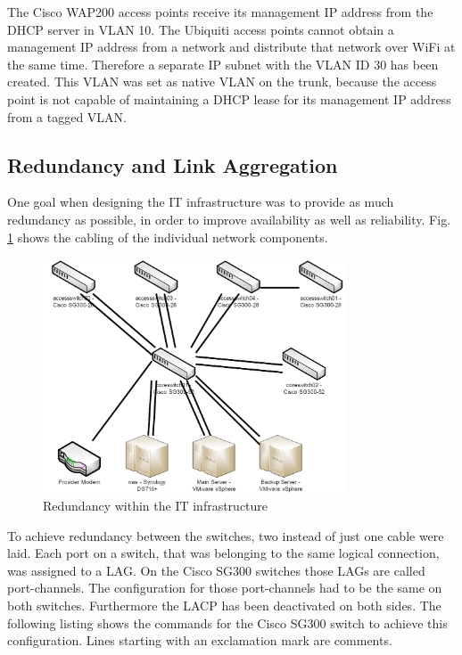 The Cisco WAP200 access points receive its management IP address from the DHCP server in VLAN 10. The Ubiquiti access points cannot obtain a management IP address from a network and distribute that network over WiFi at the same time. Therefore a separate IP subnet with the VLAN ID 30 has been created. This VLAN was set as native VLAN on the trunk, because the access point is not capable of maintaining a DHCP lease for its management IP address from a tagged VLAN. 

\subsection{Redundancy and Link Aggregation}

One goal when designing the IT infrastructure was to provide as much redundancy as possible, in order to improve availability as well as reliability. Fig. \ref{img:redundanz_in_der_netzwerkinfrastruktur} shows the cabling of the individual network components.

\begin{figure}[ht!]
	\centering
	\includegraphics[width=0.8\textwidth]{BilderAllgemein/redundanz.png}
	\caption{Redundancy within the IT infrastructure}
	\label{img:redundanz_in_der_netzwerkinfrastruktur}
\end{figure}

To achieve redundancy between the switches, two instead of just one cable were laid. Each port on a switch, that was belonging to the same logical connection, was assigned to a \ac{LAG}. On the Cisco SG300 switches those \acp{LAG} are called port-channels. The configuration for those port-channels had to be the same on both switches. Furthermore the \ac{LACP} has been deactivated on both sides. The following listing shows the commands for the Cisco SG300 switch to achieve this configuration. Lines starting with an exclamation mark are comments.

